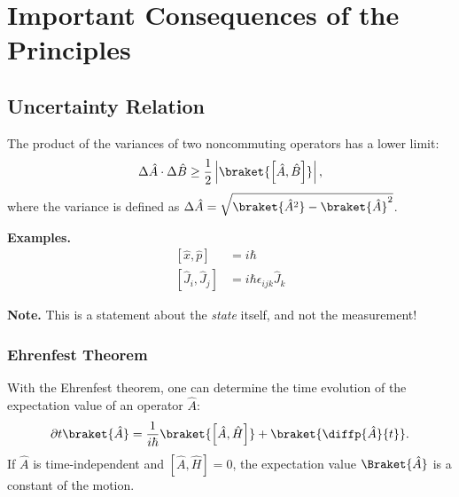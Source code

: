 \section{Important Consequences of the Principles}
\subsection{Uncertainty Relation}

The product of the variances of two noncommuting operators has a lower limit:
\begin{align}
    \Delta \hat{A} \cdot \Delta \hat{B} \geq \frac{1}{2} \left| \braket{\left[\hat{A},\hat{B}\right]} \right|,
\end{align}
where the variance is defined as $\Delta \hat{A} = \sqrt{\braket{\hat{A}^2}-\braket{\hat{A}}^2}$.

\textbf{Examples.}
\begin{align}
	\left[ \hat{x}, \hat{p} \right] &= i \hbar \\
\left[ \hat{J}_i , \hat{J}_j \right] &= i \hbar \epsilon_{ijk} \hat{J}_k
\end{align}
				
\textbf{Note.} This is a statement about the \emph{state} itself, and not the measurement!

\subsubsection{Ehrenfest Theorem}
With the Ehrenfest theorem, one can determine the time evolution of the expectation value of an operator $\hat{A}$:
\begin{align}
 \partial{}{t}\braket{\hat{A}}=\frac{1}{i\hbar}\braket{\left[\hat{A},\hat{H}\right]}+\braket{\diffp{\hat{A}}{t}}. \label{eq:ehrenfest}
\end{align}
				If $\hat{A}$ is time-independent and $\left[\hat{A},\hat{H}\right]=0$, the expectation value $\Braket{\hat{A}}$ is a constant of the motion.

	